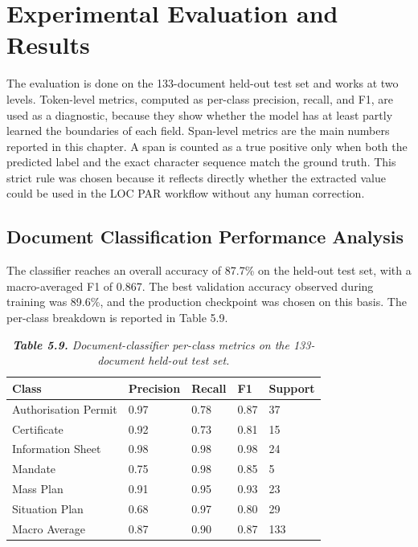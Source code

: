 \section{Experimental Evaluation and Results}

The evaluation is done on the 133-document held-out test set and works at two levels. Token-level metrics, computed as per-class precision, recall, and F1, are used as a diagnostic, because they show whether the model has at least partly learned the boundaries of each field. Span-level metrics are the main numbers reported in this chapter. A span is counted as a true positive only when both the predicted label and the exact character sequence match the ground truth. This strict rule was chosen because it reflects directly whether the extracted value could be used in the LOC PAR workflow without any human correction.

\subsection{Document Classification Performance Analysis}

The classifier reaches an overall accuracy of 87.7\% on the held-out test set, with a macro-averaged F1 of 0.867. The best validation accuracy observed during training was 89.6\%, and the production checkpoint was chosen on this basis. The per-class breakdown is reported in Table 5.9.

\begin{table}[H]
  \centering
  \caption{\textit{\textbf{Table 5.9.} Document-classifier per-class metrics on the 133-document held-out test set.}}
  \renewcommand{\arraystretch}{1.0}
  \footnotesize
  \begin{tabularx}{\textwidth}{|X|X|X|X|X|}
    \hline
    \textbf{Class} & \textbf{Precision} & \textbf{Recall} & \textbf{F1} & \textbf{Support} \\ \hline
    Authorisation Permit & 0.97 & 0.78 & 0.87 & 37 \\ \hline
    Certificate & 0.92 & 0.73 & 0.81 & 15 \\ \hline
    Information Sheet & 0.98 & 0.98 & 0.98 & 24 \\ \hline
    Mandate & 0.75 & 0.98 & 0.85 & 5 \\ \hline
    Mass Plan & 0.91 & 0.95 & 0.93 & 23 \\ \hline
    Situation Plan & 0.68 & 0.97 & 0.80 & 29 \\ \hline
    Macro Average & 0.87 & 0.90 & 0.87 & 133 \\ \hline
  \end{tabularx}
\end{table}

